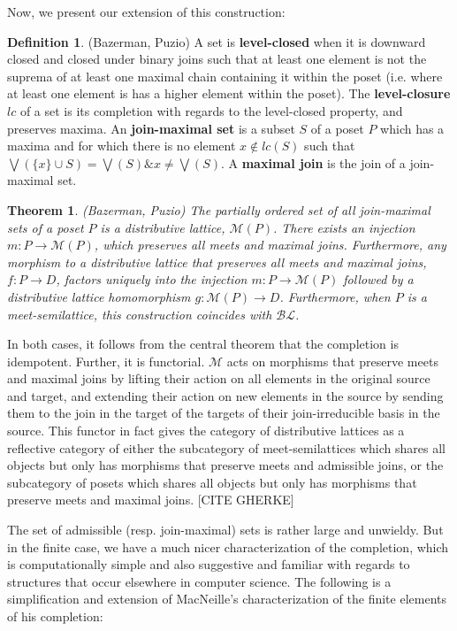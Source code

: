 \documentclass[hoptionsi,review,format=acmsmall]{acmart}
\newtheorem{theorem}{Theorem}[section]
\theoremstyle{definition}
\newtheorem{definition}{Definition}[section]
\newcommand{\Mcc}{\mathcal{M}}
\newcommand{\BLc}{\mathcal{BL}}
\newcommand{\band}{\mathbin{\&}}
\begin{document}
Now, we present our extension of this construction:

\begin{definition}
(Bazerman, Puzio) A set is \textbf{level-closed} when it is downward closed and closed under binary joins such that at least one element is not the suprema of at least one maximal chain containing it within the poset (i.e. where at least one element is has a higher element within the poset). The \textbf{level-closure} \(lc\) of a set is its completion with regards to the level-closed property, and preserves maxima. An \textbf{join-maximal set} is a subset \(S\) of a poset \(P\) which has a maxima and for which there is no element \(x \notin lc(S)\) such that \(\bigvee(\{x\} \cup S) = \bigvee(S) \band x \neq \bigvee(S)\). A \textbf{maximal join} is the join of a join-maximal set.
\end{definition}

\begin{theorem}
(Bazerman, Puzio) The partially ordered set of all join-maximal sets of a poset \(P\) is a distributive lattice, \(\Mcc(P)\). There exists an injection \(m : P \rightarrow \Mcc(P)\), which preserves all meets and maximal joins. Furthermore, any morphism to a distributive lattice that preserves all meets and maximal joins, \(f : P \rightarrow D\), factors uniquely into the injection \(m : P \rightarrow \Mcc(P)\) followed by a distributive lattice homomorphism \(g : \Mcc(P) \rightarrow D\). Furthermore, when \(P\) is a meet-semilattice, this construction coincides with \(\BLc\).
\end{theorem}

In both cases, it follows from the central theorem that the completion is idempotent. Further, it is functorial. \(\Mcc\) acts on morphisms that preserve meets and maximal joins by lifting their action on all elements in the original source and target, and extending their action on new elements in the source by sending them to the join in the target of the targets of their join-irreducible basis in the source. This functor in fact gives the category of distributive lattices as a reflective category of either the subcategory of meet-semilattices which shares all objects but only has morphisms that preserve meets and admissible joins, or the subcategory of posets which shares all objects but only has morphisms that preserve meets and maximal joins. [CITE GHERKE]

The set of admissible (resp. join-maximal) sets is rather large and unwieldy. But in the finite case, we have a much nicer characterization of the completion, which is computationally simple and also suggestive and familiar with regards to structures that occur elsewhere in computer science. The following is a simplification and extension of MacNeille's characterization of the finite elements of his completion:
\end{document}

